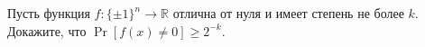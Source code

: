 Пусть функция $f\colon \{\pm 1\}^n \to \mathbb{R}$ отлична от нуля и имеет степень не более
$k$. Докажите, что $\Pr[f(x) \neq 0] \ge 2^{-k}$.
